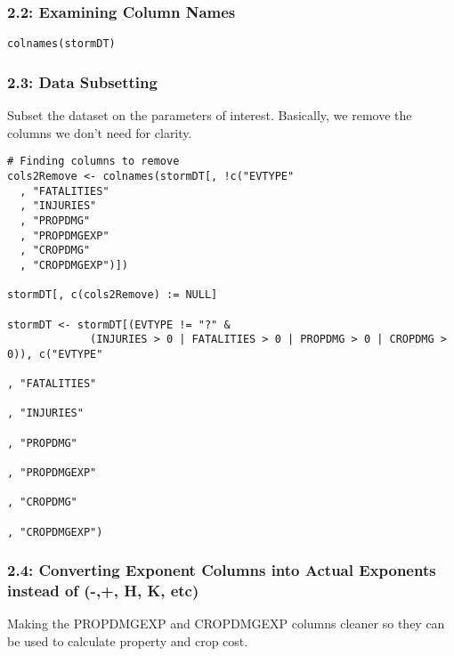 \documentclass[
]{article}
\begin{document}
\hypertarget{examining-column-names}{%
\subsubsection{2.2: Examining Column
Names}\label{examining-column-names}}

\begin{verbatim}
colnames(stormDT)
\end{verbatim}

\hypertarget{data-subsetting}{%
\subsubsection{2.3: Data Subsetting}\label{data-subsetting}}

Subset the dataset on the parameters of interest. Basically, we remove
the columns we don't need for clarity.

\begin{verbatim}
# Finding columns to remove
cols2Remove <- colnames(stormDT[, !c("EVTYPE"
  , "FATALITIES"
  , "INJURIES"
  , "PROPDMG"
  , "PROPDMGEXP"
  , "CROPDMG"
  , "CROPDMGEXP")])

stormDT[, c(cols2Remove) := NULL]

stormDT <- stormDT[(EVTYPE != "?" & 
             (INJURIES > 0 | FATALITIES > 0 | PROPDMG > 0 | CROPDMG > 0)), c("EVTYPE"
                                                                            , "FATALITIES"
                                                                            , "INJURIES"
                                                                            , "PROPDMG"
                                                                            , "PROPDMGEXP"
                                                                            , "CROPDMG"
                                                                            , "CROPDMGEXP")
\end{verbatim}

\hypertarget{converting-exponent-columns-into-actual-exponents-instead-of---h-k-etc}{%
\subsubsection{2.4: Converting Exponent Columns into Actual Exponents
instead of (-,+, H, K,
etc)}\label{converting-exponent-columns-into-actual-exponents-instead-of---h-k-etc}}

Making the PROPDMGEXP and CROPDMGEXP columns cleaner so they can be used
to calculate property and crop cost.
\end{document}
